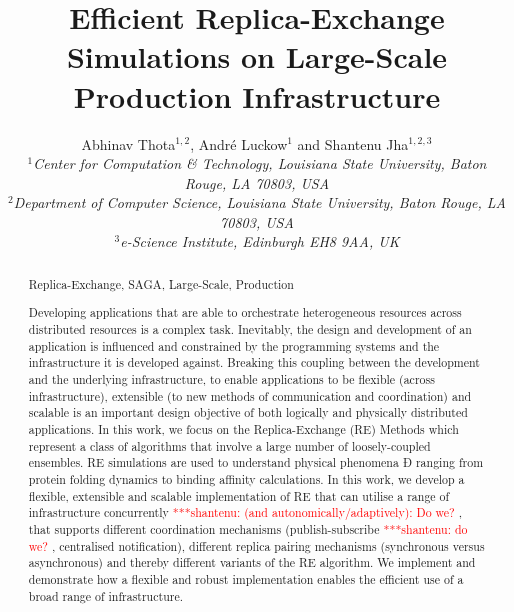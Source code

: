 \documentclass{rspublic}
\title[Efficient Replica-Exchange Simulations on
  Large-Scale Production Infrastructure]{Efficient Replica-Exchange Simulations on
  Large-Scale Production Infrastructure}
\author[Thota, Luckow, Jha]{
  Abhinav Thota$^{1,2}$, Andr\'e Luckow$^{1}$ and Shantenu Jha$^{1,2,3}$\\
  \small{\emph{$^{1}$Center for Computation \& Technology, Louisiana State University, Baton Rouge, LA 70803, USA}}\\
  \small{\emph{$^{2}$Department of Computer Science, Louisiana State
      University, Baton Rouge, LA 70803, USA}}\\
  \small{\emph{$^{3}$e-Science Institute, Edinburgh EH8 9AA, UK}}\\
}
\newcommand{\jhanote}[1]{ {\textcolor{red} { ***shantenu: #1 }}}
\newcommand{\jhanote}[1]{}
\begin{document}
 


\maketitle    

\begin{abstract}{Replica-Exchange, SAGA, Large-Scale, Production}  

  Developing applications that are able to orchestrate heterogeneous
  resources across distributed resources is a complex
  task. Inevitably, the design and development of an application is
  influenced and constrained by the programming systems and the
  infrastructure it is developed against. Breaking this coupling
  between the development and the underlying infrastructure, to enable
  applications to be flexible (across infrastructure), extensible (to
  new methods of communication and coordination) and scalable is an
  important design objective of both logically and physically
  distributed applications.  In this work, we focus on the
  Replica-Exchange (RE) Methods which represent a class of algorithms
  that involve a large number of loosely-coupled ensembles. RE
  simulations are used to understand physical phenomena Ð ranging from
  protein folding dynamics to binding affinity calculations.  In this
  work, we develop a flexible, extensible and scalable implementation
  of RE that can utilise a range of infrastructure concurrently
  \jhanote{(and autonomically/adaptively): Do we?}, that supports
  different coordination mechanisms (publish-subscribe \jhanote{do
    we?}, centralised notification), different replica pairing
  mechanisms (synchronous versus asynchronous) and thereby different
  variants of the RE algorithm. We implement and demonstrate how a
  flexible and robust implementation enables the efficient use of a
  broad range of infrastructure.


\end{abstract}
\end{document}
